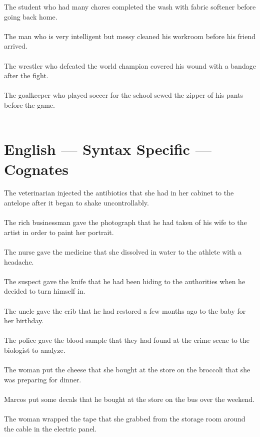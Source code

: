 The student who had many chores completed the wash with fabric softener before going back home.	\\	\\
The man who is very intelligent but messy cleaned his workroom before his friend arrived.	\\	\\
The wrestler who defeated the world champion covered his wound with a bandage after the fight.	\\	\\
The goalkeeper who played soccer for the school sewed the zipper of his pants before the game.	\\	\\

\section{English --- Syntax Specific --- Cognates}
The veterinarian injected the antibiotics that she had in her cabinet to the antelope after it began to shake uncontrollably.	\\	\\
The rich businessman gave the photograph that he had taken of his wife to the artist in order to paint her portrait.	\\	\\
The nurse gave the medicine that she dissolved in water to the athlete with a headache.	\\	\\
The suspect gave the knife that he had been hiding to the authorities when he decided to turn himself in.	\\	\\
The uncle gave the crib that he had restored a few months ago to the baby for her birthday.	\\	\\
The police gave the blood sample that they had found at the crime scene to the biologist to analyze.	\\	\\
The woman put the cheese that she bought at the store on the broccoli that she was preparing for dinner.	\\	\\
Marcos put some decals that he bought at the store on the bus over the weekend.	\\	\\
The woman wrapped the tape that she grabbed from the storage room around the cable in the electric panel.	\\	\\
